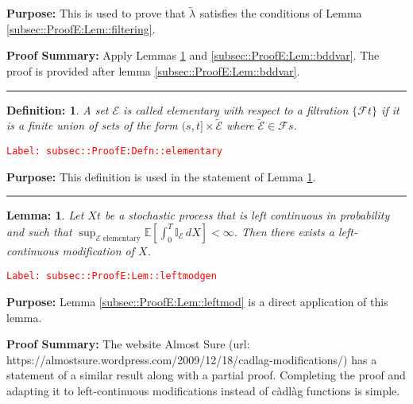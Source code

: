 \documentclass[12pt]{article}
\newcommand{\mb}{\mathbb}
\newcommand{\mc}{\mathcal}
\newcommand{\te}{\text}
\newcommand{\tr}{\textcolor{red}}
\newcommand{\labe}[1]{\tr{\texttt{Label: #1}}}
\newcommand{\purpose}{\textbf{Purpose: }}
\newcommand{\pfsum}{\textbf{Proof Summary: }}
\newcommand{\lin}{\rule{\linewidth}{0.4 pt}}
\newcommand{\ex}[1]{\mb{E}\left[#1\right]}			%
\newcommand{\T}{T}								%
\renewcommand{\t}{t}							%
\renewcommand{\tt}{s}							%
\newcommand{\F}{\mc{F}}							%
\newcommand{\X}{X}								%
\newcommand{\crate}[2]{\alt{\lambda}_{#1}^{#2}}		%
\newcommand{\alt}{\widetilde}						%
\newcommand{\evnt}{\mc{E}}						%
\newtheorem{lem}[thms]{Lemma: }
\newtheorem{defn}[thms]{Definition: }
\begin{document}
\purpose This is used to prove that \(\crate{}{}\) satisfies the conditions of Lemma \ref{subsec::ProofE:Lem::filtering}.

\pfsum Apply Lemmas \ref{subsec::ProofE:Lem::leftmodgen} and \ref{subsec::ProofE:Lem::bddvar}. The proof is provided after lemma \ref{subsec::ProofE:Lem::bddvar}.

\lin

\begin{defn}
A set \(\evnt\) is called elementary with respect to a filtration \(\{\F{}{\t}\}\) if it is a finite union of sets of the form \((\tt,\t]\times \alt{\evnt}\) where \(\alt{\evnt} \in \F{}{\tt}\).
\label{subsec::ProofE:Defn::elementary}
\end{defn}
\labe{subsec::ProofE:Defn::elementary}

\purpose This definition is used in the statement of Lemma \ref{subsec::ProofE:Lem::leftmodgen}.

\lin

\begin{lem}
Let \(\X{}{\t}\) be a stochastic process that is left continuous in probability and such that \(\sup_{\evnt\te{ elementary}}\ex{\int_0^\T \mb{I}_\evnt\,d\X{}{}} < \infty\). Then there exists a left-continuous modification of \(\X{}{}\).
\label{subsec::ProofE:Lem::leftmodgen}
\end{lem}
\labe{subsec::ProofE:Lem::leftmodgen}

\purpose Lemma \ref{subsec::ProofE:Lem::leftmod} is a direct application of this lemma.

\pfsum The website Almost Sure (url: https://almostsure.wordpress.com/2009/12/18/cadlag-modifications/) has a statement of a similar result along with a partial proof. Completing the proof and adapting it to left-continuous modifications instead of c\`adl\`ag functions is simple.
\end{document}
